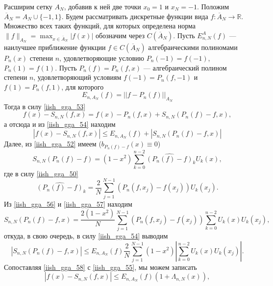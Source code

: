 Расширим сетку $A_N$, добавив к ней две точки $x_0=1$ и $x_N=-1$. Положим $\overline{A}_N=A_N \cup \{-1,1\}$.
Будем рассматривать дискретные функции вида $f: \overline{A}_N \rightarrow \mathbb{R}$. Множество всех таких функций,
для которых определена норма $\|f\|_{A_N} = \max_{x\in\overline{A}_N} |f(x)|$ обозначим через $C(\overline{A}_N)$.
Пусть $E_{n,N}^A(f)$ --- наилучшее приближение функции $f\in C(\overline{A}_N)$ алгебраическими полиномами $P_n(x)$
степени $n$, удовлетворяющие условию $P_n(-1)=f(-1)$, $P_n(1)=f(1)$. Пусть $P_n(f)=P_n(f,x)$ --- алгебраический
полином степени $n$, удовлетворяющий условиям $f(-1)=P_n(f,-1)$ и $f(1)=P_n(f,1)$, для которого
\begin{equation}
  E_{n,A_N}(f)=||f-P_n(f)||_{A_N} \label{iish_gga_54}
\end{equation}
Тогда в силу \eqref{iish_gga_53}
\begin{equation*}
  f(x)-S_{n,N}(f,x) = f(x)-P_n(f,x)+S_{n,N}(P_n(f)-f,x),
\end{equation*}
а отсюда и из \eqref{iish_gga_54} находим
\begin{equation}
  |f(x)-S_{n,N}(f,x)| \leq E_{n,A_N}(f)+|S_{n,N}(P_n(f)-f,x)| \label{iish_gga_55}
\end{equation}
Далее, из \eqref{iish_gga_52} имеем ($b_{P_n(f)-f}(x) \equiv 0$)
\begin{equation}
  S_{n,N}(P_n(f)-f) = (1-x^2)\sum\limits_{k=0}^{n-2} \hat{(P_n(f)-f)}_k U_k(x), \label{iish_gga_56}
\end{equation}
где в силу \eqref{iish_gga_50}
\begin{equation}
  \widehat{(P_n(f)-f)}_k=\frac2N\sum\limits_{j=1}^{N-1}(P_n(f,x_j)-f(x_j))U_k(x_j). \label{iish_gga_57}
\end{equation}
Из \eqref{iish_gga_56} и \eqref{iish_gga_57} находим
\begin{equation*}
  S_{n,N}(P_n(f)-f,x) = \frac{2(1-x^2)}{N}\sum\limits_{j=1}^{N-1}(P_n(f,x_j)-f(x_j))
  \sum\limits_{k=0}^{n-2}U_k(x)U_k(x_j),
\end{equation*}
откуда, в свою очередь, в силу \eqref{iish_gga_54} выводим
\begin{equation}
  |S_{n,N}(P_n(f)-f, x)| \leq E_{n,A_N}(f) \frac2N\sum\limits_{j=1}^{N-1} (1-x^2)
  \left|
    \sum\limits_{k=0}^{n-2} U_k(x)U_k(x_j)
  \right|. \label{iish_gga_58}
\end{equation}
Сопоставляя \eqref{iish_gga_58} с \eqref{iish_gga_55}, мы можем записать
\begin{equation}
  |f(x)-S_{n,N}(f,x)| \leq E_{n,A_N}(f)(1+\Lambda_{n,N}(x)), \label{iish_gga_59}
\end{equation}
